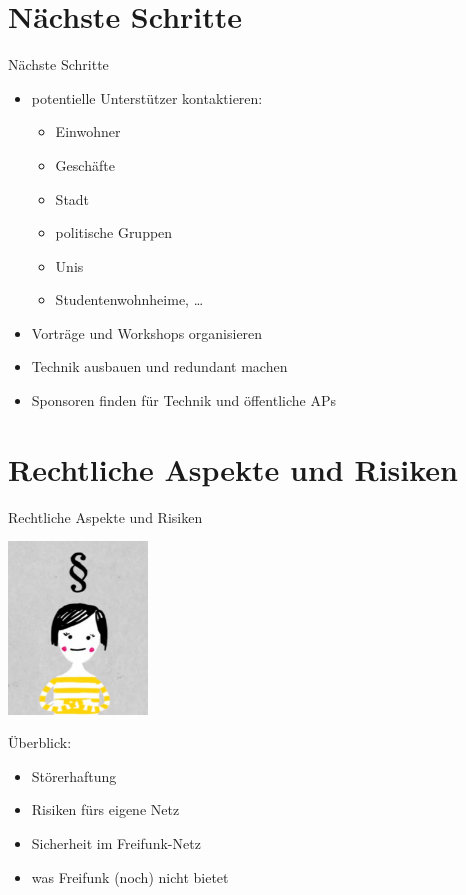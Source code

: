 \documentclass[handout]{beamer}
\begin{document}
\section{Nächste Schritte}
\begin{frame}{Nächste Schritte}
\vfill
\begin{itemize}
\pause\item potentielle Unterstützer kontaktieren:
	\begin{itemize}
		\pause\item Einwohner
		\pause\item Geschäfte
		\pause\item Stadt
		\pause\item politische Gruppen
		\pause\item Unis
		\pause\item Studentenwohnheime, \ldots
	\end{itemize}
\pause\item Vorträge und Workshops organisieren
\pause\item Technik ausbauen und redundant machen
\pause\item Sponsoren finden für Technik und öffentliche APs
\end{itemize}
\vfill
\end{frame}

\section{Rechtliche Aspekte und Risiken}
\begin{frame}{Rechtliche Aspekte und Risiken}
\begin{Row}
\begin{Cell}{1}
\vspace{0.1cm}
\includegraphics[width=3.7cm]{images/recht}
\end{Cell}
\begin{Cell}{2}
\vspace{1cm}
Überblick:
\begin{itemize}
\pause \item Störerhaftung
\pause \item Risiken fürs eigene Netz
\pause \item Sicherheit im Freifunk-Netz
\pause \item was Freifunk (noch) nicht bietet
\end{itemize}
\end{Cell}
\end{Row}
\end{frame}
\end{document}

